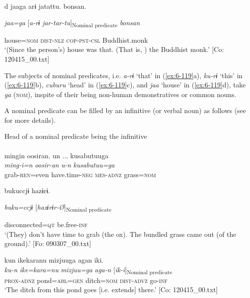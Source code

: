 \begin{table}
  d  {\TM}  jaaga  arɨ  jatattu.  bonsan.

      \textit{jaa=ga}  [\textit{a-rɨ}  \textit{jar-tar-tu}]\textsubscript{Nominal predicate}  \textit{bonsan}

      house=\textsc{nom}  \textsc{dist}-\textsc{nlz}  \textsc{cop}-\textsc{pst}-\textsc{csl}  Buddhist.monk\\
\glt ‘(Since the person’s) house was that. (That is, ) the Buddhist monk.’ [Co: 120415\_00.txt]
\z

The subjects of nominal predicates, i.e. \textit{a-rɨ} ‘that’ in (\ref{ex:6-119}a), \textit{ku-rɨ} ‘this’ in (\ref{ex:6-119}b), \textit{cuburu} ‘head’ in (\ref{ex:6-119}c), and \textit{jaa} ‘house’ in (\ref{ex:6-119}d), take \textit{ga} (\textsc{nom}), inspite of their being non-human demonstratives or common nouns.

A nominal predicate can be filled by an infinitive (or verbal noun) as follows (see  for more details).

\ea\label{ex:6-120}
 Head of a nominal predicate being the infinitive\\

 \ea{}\\
{\TM}
\glll  mingin  oosiran.  un ...  kusabutuuga\\
\textit{ming-i=n}  \textit{oosir-an}  \textit{u-n}  \textit{kusabutuu=ga}\\
grab-\textsc{ren}=even  have.time-\textsc{neg}  \textsc{mes}-\textsc{adnz}  grass=\textsc{nom}

      bukuccjɨ  hazɨrɨ.

      \textit{buku=ccjɨ}  [\textit{hazɨrɨr-Ø}]\textsubscript{Nominal predicate}

      disconnected=\textsc{qt}  be.free-\textsc{inf}\\
\glt ‘(They) don’t have time to grab (the ox). The bundled grass came out (of the ground).’ [Fo: 090307\_00.txt]
\z

\ex {\TM}  kun  {\textbar}ike{\textbar}karanu  mizjuuga  agan  iki.\\
\glll \textit{ku-n}  \textit{ike=kara=nu}  \textit{mizjuu=ga}  \textit{aga-n}  [\textit{ik-i}]\textsubscript{Nominal predicate}\\
\textsc{prox}-\textsc{adnz}  pond=\textsc{abl}=\textsc{gen}  ditch=\textsc{nom}  \textsc{dist}-\textsc{advz}  go-\textsc{inf}\\
\glt ‘The ditch from this pond goes [i.e. extends] there.’ [Co: 120415\_00.txt]
\z


\end{table}
